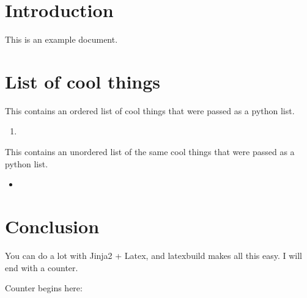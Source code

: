 \documentclass[12pt]{article}
\title{\BLOCK{block title}\BLOCK{endblock}}
\author{\vspace{-5ex}}
\date{\vspace{-5ex}}
\newcounter{session}
\begin{document}
\maketitle

\section*{Introduction}

This is an example document. 

\section*{List of cool things}

This contains an ordered list of cool things that were passed as a python list.


\begin{enumerate}
  \item {}
\end{enumerate}

This contains an unordered list of the same cool things that were passed as a python list.

\begin{itemize}
  \item {}
\end{itemize}

\section*{Conclusion}

You can do a lot with Jinja2 + Latex, and latexbuild makes all this easy. I will end with a counter.

Counter begins here: \\
\setcounter{session}{0}
 \\
 \\
 \\
 \\
 \\
 \\
\end{document}
